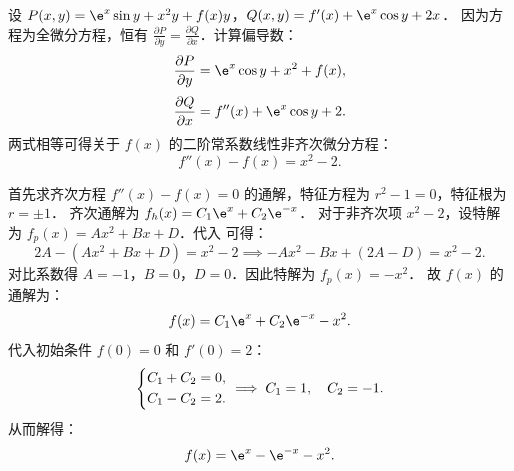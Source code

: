 \begin{solution}
    设 $P(x,y) = \e^x \sin y + x^2y + f(x)y$，$Q(x,y) = f'(x) + \e^x \cos y + 2x$．
    因为方程为全微分方程，恒有 $\frac{\partial P}{\partial y} = \frac{\partial Q}{\partial x}$．计算偏导数：
    \begin{equation}
        \frac{\partial P}{\partial y} = \e^x \cos y + x^2 + f(x),
    \end{equation}
    \begin{equation}
        \frac{\partial Q}{\partial x} = f''(x) + \e^x \cos y + 2.
    \end{equation}
    两式相等可得关于 $f(x)$ 的二阶常系数线性非齐次微分方程：
    \begin{equation}
        \label{eq:p13-ode}
        f''(x) - f(x) = x^2 - 2.
    \end{equation}

    首先求齐次方程 $f''(x) - f(x) = 0$ 的通解，特征方程为 $r^2 - 1 = 0$，特征根为 $r = \pm 1$．
    齐次通解为 $f_h(x) = C_1 \e^x + C_2 \e^{-x}$．
    对于非齐次项 $x^2 - 2$，设特解为 $f_p(x) = Ax^2 + Bx + D$．代入  可得：
    \begin{equation}
        2A - (Ax^2 + Bx + D) = x^2 - 2 \implies -Ax^2 - Bx + (2A - D) = x^2 - 2.
    \end{equation}
    对比系数得 $A = -1$，$B = 0$，$D = 0$．因此特解为 $f_p(x) = -x^2$．
    故 $f(x)$ 的通解为：
    \begin{equation}
        f(x) = C_1 \e^x + C_2 \e^{-x} - x^2.
    \end{equation}
    代入初始条件 $f(0) = 0$ 和 $f'(0) = 2$：
    \begin{equation}
        \begin{dcases}
            C_1 + C_2 = 0, \\
            C_1 - C_2 = 2.
        \end{dcases}
        \implies C_1 = 1, \quad C_2 = -1.
    \end{equation}
    从而解得：
    \begin{equation}
        f(x) = \e^x - \e^{-x} - x^2.
    \end{equation}


\end{solution}
